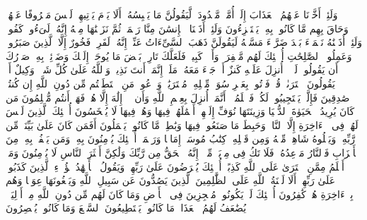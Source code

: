 \stopbuffer%
\startbuffer[\q:11:8]
وَلَئِنۡ أَخَّرۡنَا عَنۡهُمُ ٱلۡعَذَابَ إِلَىٰۤ أُمَّةࣲ مَّعۡدُودَةࣲ لَّیَقُولُنَّ مَا یَحۡبِسُهُۥۤۗ أَلَا یَوۡمَ یَأۡتِیهِمۡ لَیۡسَ مَصۡرُوفًا عَنۡهُمۡ وَحَاقَ بِهِم مَّا كَانُوا۟ بِهِۦ یَسۡتَهۡزِءُونَ%
\stopbuffer%
\startbuffer[\q:11:9]
وَلَئِنۡ أَذَقۡنَا ٱلۡإِنسَٰنَ مِنَّا رَحۡمَةࣰ ثُمَّ نَزَعۡنَٰهَا مِنۡهُ إِنَّهُۥ لَیَءُوسࣱ كَفُورࣱ%
\stopbuffer%
\startbuffer[\q:11:10]
وَلَئِنۡ أَذَقۡنَٰهُ نَعۡمَاۤءَ بَعۡدَ ضَرَّاۤءَ مَسَّتۡهُ لَیَقُولَنَّ ذَهَبَ ٱلسَّیِّءَاتُ عَنِّیۤۚ إِنَّهُۥ لَفَرِحࣱ فَخُورٌ%
\stopbuffer%
\startbuffer[\q:11:11]
إِلَّا ٱلَّذِینَ صَبَرُوا۟ وَعَمِلُوا۟ ٱلصَّٰلِحَٰتِ أُو۟لَٰۤئِكَ لَهُم مَّغۡفِرَةࣱ وَأَجۡرࣱ كَبِیرࣱ%
\stopbuffer%
\startbuffer[\q:11:12]
فَلَعَلَّكَ تَارِكُۢ بَعۡضَ مَا یُوحَىٰۤ إِلَیۡكَ وَضَاۤئِقُۢ بِهِۦ صَدۡرُكَ أَن یَقُولُوا۟ لَوۡلَاۤ أُنزِلَ عَلَیۡهِ كَنزٌ أَوۡ جَاۤءَ مَعَهُۥ مَلَكٌۚ إِنَّمَاۤ أَنتَ نَذِیرࣱۚ وَٱللَّهُ عَلَىٰ كُلِّ شَیۡءࣲ وَكِیلٌ%
\stopbuffer%
\startbuffer[\q:11:13]
أَمۡ یَقُولُونَ ٱفۡتَرَىٰهُۖ قُلۡ فَأۡتُوا۟ بِعَشۡرِ سُوَرࣲ مِّثۡلِهِۦ مُفۡتَرَیَٰتࣲ وَٱدۡعُوا۟ مَنِ ٱسۡتَطَعۡتُم مِّن دُونِ ٱللَّهِ إِن كُنتُمۡ صَٰدِقِینَ%
\stopbuffer%
\startbuffer[\q:11:14]
فَإِلَّمۡ یَسۡتَجِیبُوا۟ لَكُمۡ فَٱعۡلَمُوۤا۟ أَنَّمَاۤ أُنزِلَ بِعِلۡمِ ٱللَّهِ وَأَن لَّاۤ إِلَٰهَ إِلَّا هُوَۖ فَهَلۡ أَنتُم مُّسۡلِمُونَ%
\stopbuffer%
\startbuffer[\q:11:15]
مَن كَانَ یُرِیدُ ٱلۡحَیَوٰةَ ٱلدُّنۡیَا وَزِینَتَهَا نُوَفِّ إِلَیۡهِمۡ أَعۡمَٰلَهُمۡ فِیهَا وَهُمۡ فِیهَا لَا یُبۡخَسُونَ%
\stopbuffer%
\startbuffer[\q:11:16]
أُو۟لَٰۤئِكَ ٱلَّذِینَ لَیۡسَ لَهُمۡ فِی ٱلۡءَاخِرَةِ إِلَّا ٱلنَّارُۖ وَحَبِطَ مَا صَنَعُوا۟ فِیهَا وَبَٰطِلࣱ مَّا كَانُوا۟ یَعۡمَلُونَ%
\stopbuffer%
\startbuffer[\q:11:17]
أَفَمَن كَانَ عَلَىٰ بَیِّنَةࣲ مِّن رَّبِّهِۦ وَیَتۡلُوهُ شَاهِدࣱ مِّنۡهُ وَمِن قَبۡلِهِۦ كِتَٰبُ مُوسَىٰۤ إِمَامࣰا وَرَحۡمَةًۚ أُو۟لَٰۤئِكَ یُؤۡمِنُونَ بِهِۦۚ وَمَن یَكۡفُرۡ بِهِۦ مِنَ ٱلۡأَحۡزَابِ فَٱلنَّارُ مَوۡعِدُهُۥۚ فَلَا تَكُ فِی مِرۡیَةࣲ مِّنۡهُۚ إِنَّهُ ٱلۡحَقُّ مِن رَّبِّكَ وَلَٰكِنَّ أَكۡثَرَ ٱلنَّاسِ لَا یُؤۡمِنُونَ%
\stopbuffer%
\startbuffer[\q:11:18]
وَمَنۡ أَظۡلَمُ مِمَّنِ ٱفۡتَرَىٰ عَلَى ٱللَّهِ كَذِبًاۚ أُو۟لَٰۤئِكَ یُعۡرَضُونَ عَلَىٰ رَبِّهِمۡ وَیَقُولُ ٱلۡأَشۡهَٰدُ هَٰۤؤُلَاۤءِ ٱلَّذِینَ كَذَبُوا۟ عَلَىٰ رَبِّهِمۡۚ أَلَا لَعۡنَةُ ٱللَّهِ عَلَى ٱلظَّٰلِمِینَ%
\stopbuffer%
\startbuffer[\q:11:19]
ٱلَّذِینَ یَصُدُّونَ عَن سَبِیلِ ٱللَّهِ وَیَبۡغُونَهَا عِوَجࣰا وَهُم بِٱلۡءَاخِرَةِ هُمۡ كَٰفِرُونَ%
\stopbuffer%
\startbuffer[\q:11:20]
أُو۟لَٰۤئِكَ لَمۡ یَكُونُوا۟ مُعۡجِزِینَ فِی ٱلۡأَرۡضِ وَمَا كَانَ لَهُم مِّن دُونِ ٱللَّهِ مِنۡ أَوۡلِیَاۤءَۘ یُضَٰعَفُ لَهُمُ ٱلۡعَذَابُۚ مَا كَانُوا۟ یَسۡتَطِیعُونَ ٱلسَّمۡعَ وَمَا كَانُوا۟ یُبۡصِرُونَ%
